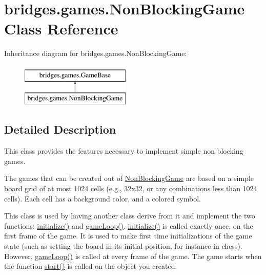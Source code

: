 \hypertarget{classbridges_1_1games_1_1_non_blocking_game}{}\section{bridges.\+games.\+Non\+Blocking\+Game Class Reference}
\label{classbridges_1_1games_1_1_non_blocking_game}
Inheritance diagram for bridges.\+games.\+Non\+Blocking\+Game\+:\begin{figure}[H]
\begin{center}
\leavevmode
\includegraphics[height=2.000000cm]{classbridges_1_1games_1_1_non_blocking_game}
\end{center}
\end{figure}


\subsection{Detailed Description}
This class provides the features necessary to implement simple non blocking games. 

The games that can be created out of \mbox{\hyperlink{classbridges_1_1games_1_1_non_blocking_game}{Non\+Blocking\+Game}} are based on a simple board grid of at most 1024 cells (e.\+g., 32x32, or any combinations less than 1024 cells). Each cell has a background color, and a colored symbol.

This class is used by having another class derive from it and implement the two functions\+: \mbox{\hyperlink{classbridges_1_1games_1_1_game_base_a973a52d5eee7c29b01d668fba3c61657}{initialize()}} and \mbox{\hyperlink{classbridges_1_1games_1_1_game_base_a56d05ed744791cfc1c3792f39ff438f1}{game\+Loop()}}. \mbox{\hyperlink{classbridges_1_1games_1_1_game_base_a973a52d5eee7c29b01d668fba3c61657}{initialize()}} is called exactly once, on the first frame of the game. It is used to make first time initializations of the game state (such as setting the board in its initial position, for instance in chess). However, \mbox{\hyperlink{classbridges_1_1games_1_1_game_base_a56d05ed744791cfc1c3792f39ff438f1}{game\+Loop()}} is called at every frame of the game. The game starts when the function \mbox{\hyperlink{classbridges_1_1games_1_1_non_blocking_game_ac4df60691641278f139d138c7347674a}{start()}} is called on the object you created.

